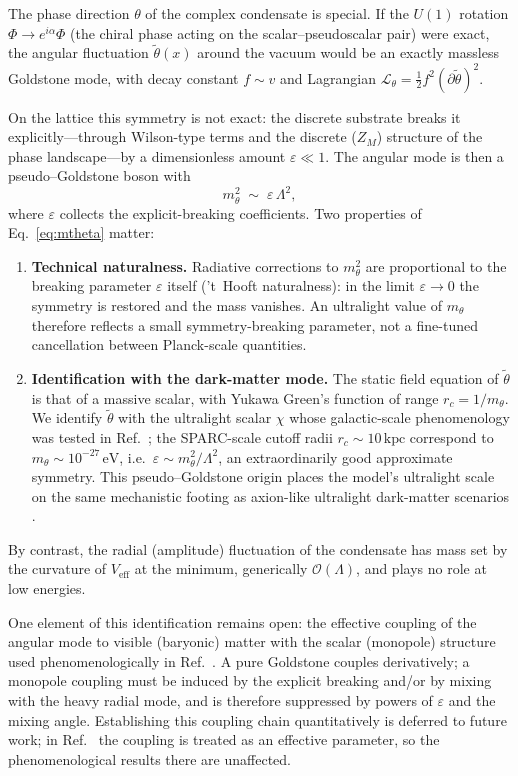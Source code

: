 \documentclass[11pt,a4paper]{article}
\begin{document}
The phase direction $\theta$ of the complex condensate is special.
If the $U(1)$ rotation
$\Phi \to e^{i\alpha}\Phi$ (the chiral phase acting on the
scalar--pseudoscalar pair) were exact, the angular fluctuation
$\tilde{\theta}(x)$ around the vacuum would be an exactly massless
Goldstone mode, with decay constant $f \sim v$ and Lagrangian
$\mathcal{L}_\theta = \tfrac{1}{2}f^2(\partial\tilde\theta)^2$.

On the lattice this symmetry is not exact: the discrete substrate
breaks it explicitly---through Wilson-type terms and the discrete
($Z_M$) structure of the phase landscape---by a dimensionless
amount $\varepsilon \ll 1$.
The angular mode is then a pseudo--Goldstone boson with
\begin{equation}
m_\theta^2 \;\sim\; \varepsilon\,\Lambda^2 ,
\label{eq:mtheta}
\end{equation}
where $\varepsilon$ collects the explicit-breaking coefficients.
Two properties of Eq.~\eqref{eq:mtheta} matter:
\begin{enumerate}
\item \textbf{Technical naturalness.}
Radiative corrections to $m_\theta^2$ are proportional to the
breaking parameter $\varepsilon$ itself ('t~Hooft naturalness):
in the limit $\varepsilon \to 0$ the symmetry is restored and the
mass vanishes.
An ultralight value of $m_\theta$ therefore reflects a small
symmetry-breaking parameter, not a fine-tuned cancellation between
Planck-scale quantities.
\item \textbf{Identification with the dark-matter mode.}
The static field equation of $\tilde\theta$ is that of a massive
scalar, with Yukawa Green's function of range
$r_c = 1/m_\theta$.
We identify $\tilde\theta$ with the ultralight scalar $\chi$ whose
galactic-scale phenomenology was tested in
Ref.~\cite{Cheng:2025sparc}; the SPARC-scale cutoff radii
$r_c \sim 10\,\mathrm{kpc}$ correspond to
$m_\theta \sim 10^{-27}\,\mathrm{eV}$, i.e.\
$\varepsilon \sim m_\theta^2/\Lambda^2$, an extraordinarily good
approximate symmetry.
This pseudo--Goldstone origin places the model's ultralight scale
on the same mechanistic footing as axion-like ultralight
dark-matter scenarios \cite{Hui:2016ltb}.
\end{enumerate}

By contrast, the radial (amplitude) fluctuation of the condensate
has mass set by the curvature of $V_{\mathrm{eff}}$ at the minimum,
generically $\mathcal{O}(\Lambda)$, and plays no role at low
energies.

One element of this identification remains open: the effective
coupling of the angular mode to visible (baryonic) matter with the
scalar (monopole) structure used phenomenologically in
Ref.~\cite{Cheng:2025sparc}.
A pure Goldstone couples derivatively; a monopole coupling must be
induced by the explicit breaking and/or by mixing with the heavy
radial mode, and is therefore suppressed by powers of
$\varepsilon$ and the mixing angle.
Establishing this coupling chain quantitatively is deferred to
future work; in Ref.~\cite{Cheng:2025sparc} the coupling is
treated as an effective parameter, so the phenomenological results
there are unaffected.
\end{document}
